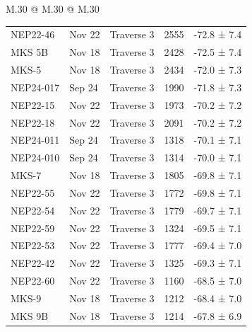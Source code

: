 \begin{landscape}
\begin{table}
\begin{tabular}{M{.30\textwidth} @{\hspace{4cm}} M{.30\textwidth} @{\hspace{4cm}} M{.30\textwidth}}
\begin{tabular}{l l l l l}
    NEP22-46 & Nov 22 & Traverse 3 & 2555 & -72.8 ±  7.4 \\
    MKS 5B & Nov 18 & Traverse 3 & 2428 & -72.5 ±  7.4 \\
    MKS-5 & Nov 18 & Traverse 3 & 2434 & -72.0 ±  7.3 \\
    NEP24-017 & Sep 24 & Traverse 3 & 1990 & -71.8 ±  7.3 \\
    NEP22-15 & Nov 22 & Traverse 3 & 1973 & -70.2 ±  7.2 \\
    NEP22-18 & Nov 22 & Traverse 3 & 2091 & -70.2 ±  7.2 \\
    NEP24-011 & Sep 24 & Traverse 3 & 1318 & -70.1 ±  7.1 \\
    NEP24-010 & Sep 24 & Traverse 3 & 1314 & -70.0 ±  7.1 \\
    MKS-7 & Nov 18 & Traverse 3 & 1805 & -69.8 ±  7.1 \\
    NEP22-55 & Nov 22 & Traverse 3 & 1772 & -69.8 ±  7.1 \\
    NEP22-54 & Nov 22 & Traverse 3 & 1779 & -69.7 ±  7.1 \\
    NEP22-59 & Nov 22 & Traverse 3 & 1324 & -69.5 ±  7.1 \\
    NEP22-53 & Nov 22 & Traverse 3 & 1777 & -69.4 ±  7.0 \\
    NEP22-42 & Nov 22 & Traverse 3 & 1325 & -69.3 ±  7.1 \\
    NEP22-60 & Nov 22 & Traverse 3 & 1160 & -68.5 ±  7.0 \\
    MKS-9 & Nov 18 & Traverse 3 & 1212 & -68.4 ±  7.0 \\
    MKS 9B & Nov 18 & Traverse 3 & 1214 & -67.8 ±  6.9 \\
    \hline
        \end{tabular}\\ %
    \end{tabular}
\end{table}
\end{landscape}

   \newpage

